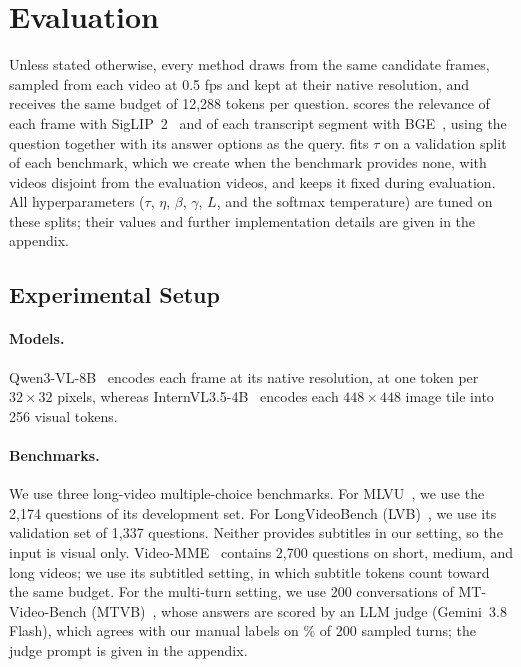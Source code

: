 \section{Evaluation}
\label{sec:exp}

Unless
stated otherwise, every method draws from the same candidate frames, sampled from each video at 0.5 fps and kept at
their native resolution, and receives the same budget of 12,288 tokens per question. \name scores the relevance of each frame with SigLIP~2~\cite{siglip2} and of each transcript segment with
BGE~\cite{bge}, using the question together with its answer options as the query. \name fits $\tau$ on a validation split of each benchmark, which we create when the benchmark provides none, with videos disjoint from the evaluation videos, and keeps it fixed during evaluation. All hyperparameters ($\tau$, $\eta$, $\beta$, $\gamma$, $L$, and the softmax temperature) are tuned on these splits; their values and further implementation details are given in the appendix.

\subsection{Experimental Setup}
\label{sec:exp-setup}

\paragraph{Models.} Qwen3-VL-8B~\cite{bai2025qwen3vl}
encodes each frame at its native resolution, at one token per $32\times32$ pixels, whereas
InternVL3.5-4B~\cite{wang2025internvl35} encodes each $448\times448$ image tile into 256 visual tokens.

\paragraph{Benchmarks.} We use three long-video multiple-choice benchmarks. For MLVU~\cite{zhou2024mlvu}, we use the 2,174 questions of its development set. For LongVideoBench
(LVB)~\cite{wu2024longvideobench}, we use its validation set of 1,337 questions. Neither provides subtitles in our setting, so the input is visual only.
Video-MME~\cite{fu2024videomme} contains 2,700 questions on short, medium, and long videos; we use its subtitled
setting, in which subtitle tokens count toward the same budget. For the multi-turn setting, we use 200 conversations of
MT-Video-Bench (MTVB)~\cite{mtvideobench2025}, whose answers are scored by an LLM judge (Gemini~3.8 Flash), which agrees with our manual labels on \% of 200 sampled turns; the judge prompt is given in the appendix.

